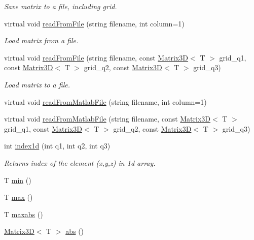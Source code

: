 \begin{DoxyCompactItemize}
\begin{DoxyCompactList}\small\item\em Save matrix to a file, including grid. \end{DoxyCompactList}\item 
virtual void \hyperlink{class_matrix3_d_a8ec06237d02ba61aed804cebd03ab59b}{read\+From\+File} (string filename, int column=1)
\begin{DoxyCompactList}\small\item\em Load matrix from a file. \end{DoxyCompactList}\item 
virtual void \hyperlink{class_matrix3_d_a85ba47159cc0f55f16b6138beec6e05f}{read\+From\+File} (string filename, const \hyperlink{class_matrix3_d}{Matrix3\+D}$<$ T $>$ grid\+\_\+q1, const \hyperlink{class_matrix3_d}{Matrix3\+D}$<$ T $>$ grid\+\_\+q2, const \hyperlink{class_matrix3_d}{Matrix3\+D}$<$ T $>$ grid\+\_\+q3)
\begin{DoxyCompactList}\small\item\em Load matrix to a file. \end{DoxyCompactList}\item 
virtual void \hyperlink{class_matrix3_d_a9534855c7f8005376991630e0a069194}{read\+From\+Matlab\+File} (string filename, int column=1)
\item 
virtual void \hyperlink{class_matrix3_d_a42c7e0031c91326c3637d6b0f6a3345d}{read\+From\+Matlab\+File} (string filename, const \hyperlink{class_matrix3_d}{Matrix3\+D}$<$ T $>$ grid\+\_\+q1, const \hyperlink{class_matrix3_d}{Matrix3\+D}$<$ T $>$ grid\+\_\+q2, const \hyperlink{class_matrix3_d}{Matrix3\+D}$<$ T $>$ grid\+\_\+q3)
\item 
int \hyperlink{class_matrix3_d_ad7e89a87409444fade7f6d35dca52877}{index1d} (int q1, int q2, int q3)
\begin{DoxyCompactList}\small\item\em Returns index of the element (x,y,z) in 1d array. \end{DoxyCompactList}\item 
T \hyperlink{class_matrix3_d_a5a15d93a8739a595384e67bbb84f3dc4}{min} ()
\item 
T \hyperlink{class_matrix3_d_ad40e82f2b8be5bc392b5b7197e53318f}{max} ()
\item 
T \hyperlink{class_matrix3_d_a693a1e9134c7ffcd80221292015e8180}{maxabs} ()
\item 
\hyperlink{class_matrix3_d}{Matrix3\+D}$<$ T $>$ \hyperlink{class_matrix3_d_a46ae0b6acf77cd63b72149eb753c7ded}{abs} ()

\end{DoxyCompactItemize}
